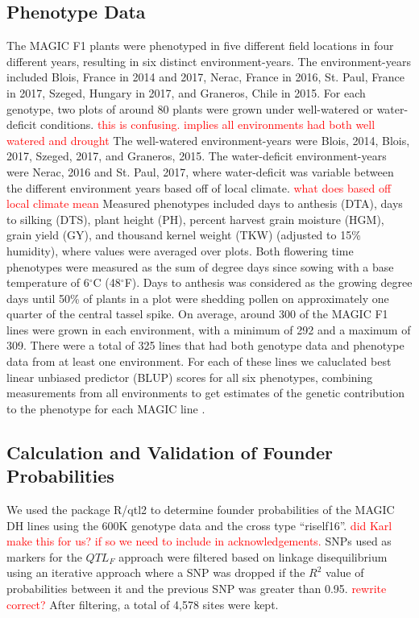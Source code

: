 \documentclass[article,9pt,twocolumn,twoside]{rilabRxiv}
\newcommand{\jri}[1]{{\small \textcolor{red}{#1}}}
\begin{document}
\subsection{Phenotype Data}
The MAGIC F1 plants were phenotyped in five different field locations in four different years, resulting in six distinct environment-years.
The environment-years included Blois, France in 2014 and 2017, Nerac, France in 2016, St. Paul, France in 2017, Szeged, Hungary in 2017, and Graneros, Chile in 2015.
For each genotype, two plots of around 80 plants were grown under well-watered or water-deficit conditions. \jri{this is confusing. implies all environments had both well watered and drought}
The well-watered environment-years were Blois, 2014, Blois, 2017, Szeged, 2017, and Graneros, 2015.
The water-deficit environment-years were Nerac, 2016 and St. Paul, 2017, where water-deficit was variable between the different environment years based off of local climate. \jri{what does based off local climate mean}
Measured phenotypes included days to anthesis (DTA), days to silking (DTS), plant height (PH), percent harvest grain moisture (HGM), grain yield (GY), and thousand kernel weight (TKW) (adjusted to 15\% humidity), where values were averaged over plots.
Both flowering time phenotypes were measured as the sum of degree days since sowing with a base temperature of 6$^{\circ}$C (48$^{\circ}$F).
Days to anthesis was considered as the growing degree days until 50\% of plants in a plot were shedding pollen on approximately one quarter of the central tassel spike.
On average, around 300 of the MAGIC F1 lines were grown in each environment, with a minimum of 292 and a maximum of 309.
There were a total of 325 lines that had both genotype data and phenotype data from at least one environment.
For each of these lines we caluclated best linear unbiased predictor (BLUP) scores for all six phenotypes, combining measurements from all environments to get estimates of the genetic contribution to the phenotype for each MAGIC line \cite{Aulchenko}.


\subsection{Calculation and Validation of Founder Probabilities}
We used the package R/qtl2 \citep{Broman} to determine founder probabilities of the MAGIC DH lines using the 600K genotype data and the cross type ``riself16''. \jri{did  Karl  make this for us? if  so we need  to  include in acknowledgements. }
SNPs used as  markers for the $QTL_F$ approach were filtered based on linkage disequilibrium using an iterative approach where a SNP was dropped if the $R^2$ value of probabilities between it and the previous SNP was greater than 0.95. \jri{rewrite correct?}
After filtering, a total of 4,578 sites were kept. %
\end{document}
